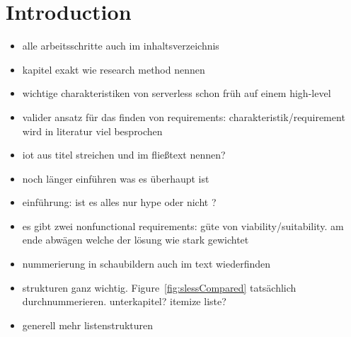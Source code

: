 \chapter{Introduction}

\begin{itemize}
        
    \item alle arbeitsschritte auch im inhaltsverzeichnis  
    
    \item kapitel exakt wie research method nennen 
    
    \item wichtige charakteristiken von serverless schon früh auf einem high-level  
    
    \item valider ansatz für das finden von requirements: charakteristik/requirement wird in literatur viel besprochen
        
    \item iot aus titel streichen und im fließtext nennen?
    
    \item noch länger einführen was es überhaupt ist
    
    \item einführung: ist es alles nur hype oder nicht ?
    
    \item es gibt zwei nonfunctional requirements: güte von viability/suitability. 
    am ende abwägen welche der lösung wie stark gewichtet
    
    \item nummerierung in schaubildern auch im text wiederfinden
    
    \item strukturen ganz wichtig. Figure~\vref{fig:slessCompared} tatsächlich durchnummerieren. unterkapitel? itemize liste?
    
    \item generell mehr listenstrukturen 
    
\end{itemize}



